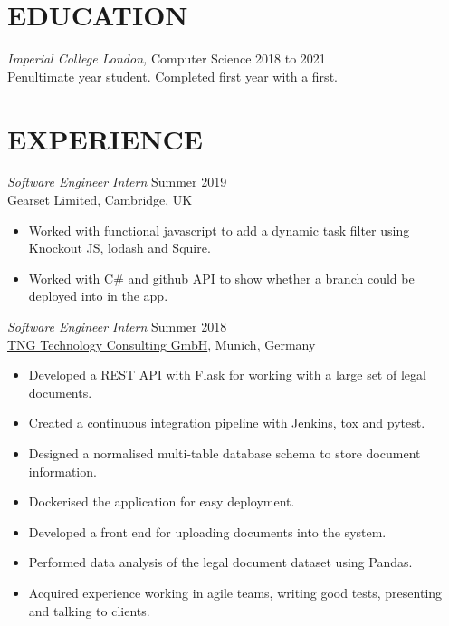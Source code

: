 \documentclass[margin, 10pt]{res} %
\begin{document}
\begin{resume}

\section{EDUCATION}

{\sl Imperial College London,} Computer Science \hfill 2018 to 2021\\
Penultimate year student. Completed first year with a first.
 
\section{EXPERIENCE}

{\sl Software Engineer Intern} \hfill Summer 2019\\
Gearset Limited, Cambridge, UK

\begin{itemize} \itemsep -2pt %
    \item Worked with functional javascript to add a dynamic task filter using Knockout JS, lodash and Squire.
    \item Worked with C\# and github API to show whether a branch could be deployed into in the app.
\end{itemize}
 
{\sl Software Engineer Intern} \hfill Summer 2018\\
\href{https://www.tngtech.com/en.html}{TNG Technology Consulting GmbH}, Munich, Germany

\begin{itemize} \itemsep -2pt
	\item Developed a REST API with Flask for working with a large set of legal documents.
    \item Created a continuous integration pipeline with Jenkins, tox and pytest.
    \item Designed a normalised multi-table database schema to store document information.
    \item Dockerised the application for easy deployment.
    \item Developed a front end for uploading documents into the system.
    \item Performed data analysis of the legal document dataset using Pandas.
    \item Acquired experience working in agile teams, writing good tests, presenting and talking to clients.
\end{itemize}


\end{resume}
\end{document}
